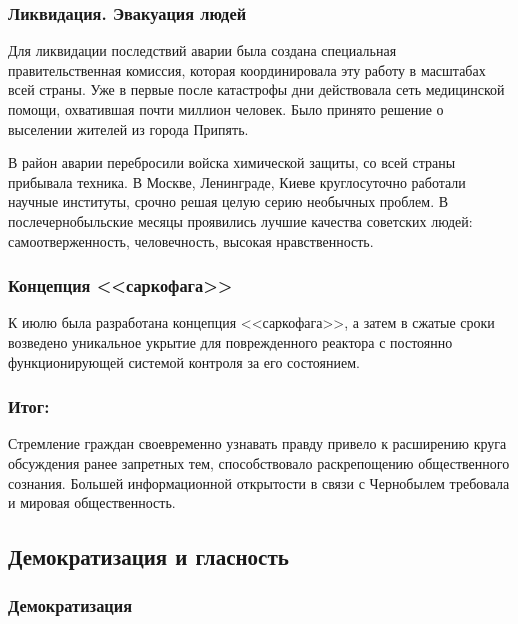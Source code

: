 \subsubsection{\textbf{Ликвидация. Эвакуация людей}}

Для ликвидации последствий аварии была создана специальная правительственная комиссия, которая координировала эту работу в масштабах всей страны. Уже в первые после катастрофы дни действовала сеть медицинской помощи, охватившая почти миллион человек. Было принято решение о выселении жителей из города Припять. 

В район аварии перебросили войска химической защиты, со всей страны прибывала техника. В Москве, Ленинграде, Киеве круглосуточно работали научные институты, срочно решая целую серию необычных проблем. В послечернобыльские месяцы проявились лучшие качества советских людей: самоотверженность, человечность, высокая нравственность.

\subsubsection{\textbf{Концепция <<саркофага>>}}

К июлю была разработана концепция <<саркофага>>, а затем в сжатые сроки возведено уникальное укрытие для поврежденного реактора с постоянно функционирующей системой контроля за его состоянием.

\subsubsection{\textbf{Итог:}}

Стремление граждан своевременно узнавать правду привело к расширению круга обсуждения ранее запретных тем, способствовало раскрепощению общественного сознания. Большей информационной открытости в связи с Чернобылем требовала и мировая общественность.

\subsection{Демократизация и гласность}

\subsubsection{\textbf{Демократизация}}

